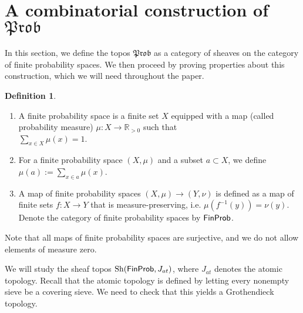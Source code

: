\documentclass[a4paper]{amsproc}
\theoremstyle{plain}
\theoremstyle{definition}
\newtheorem{definition}[theorem]{Definition}
\theoremstyle{remark}
\numberwithin{equation}{section}
\DeclareMathOperator{\Sh}{Sh}
\newcommand{\FinProb}{\textup{\textsf{FinProb}}}
\newcommand{\Prob}{\mathfrak{Prob}}
\begin{document}
\section{A combinatorial construction of $\Prob$}\label{section_combinatorial}

In this section, we define the topos $\Prob$ as a category of sheaves on the category of finite probability spaces. We then proceed by proving properties about this construction, which we will need throughout the paper.


\begin{definition}
    \mbox{}
    \begin{enumerate}
        \item A finite probability space is a finite set $X$ equipped with a map (called probability measure) $\mu: X \to \mathbb{R}_{>0}$ such that \\ $\sum_{x \in X} \mu(x) = 1$.
        \item For a finite probability space $(X,\mu)$ and a subset $a \subset X$, we define $\mu(a) := \sum_{x \in a} \mu(x)$.
        \item A map of finite probability spaces $(X,\mu) \to (Y,\nu)$ is defined as a map of finite sets $f: X \to Y$ that is measure-preserving, i.e. $\mu(f^{-1}(y)) = \nu(y)$. Denote the category of finite probability spaces by $\FinProb$.
    \end{enumerate}
\end{definition}

Note that all maps of finite probability spaces are surjective, and we do not allow elements of measure zero.

We will study the sheaf topos $\Sh(\FinProb, J_{at})$, where $J_{at}$ denotes the atomic topology. Recall that the atomic topology is defined by letting every nonempty sieve be a covering sieve. We need to check that this yields a Grothendieck topology.
\end{document}
